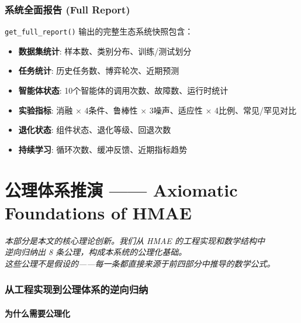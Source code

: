 \documentclass[11pt,a4paper]{ctexart}
\theoremstyle{remark}
\begin{document}
\section{系统全面报告 (Full Report)}

\texttt{get\_full\_report()} 输出的完整生态系统快照包含：
\begin{itemize}[nosep]
\item \textbf{数据集统计}: 样本数、类别分布、训练/测试划分
\item \textbf{任务统计}: 历史任务数、博弈轮次、近期预测
\item \textbf{智能体状态}: 10个智能体的调用次数、故障数、运行时统计
\item \textbf{实验指标}: 消融 $\times$ 4条件、鲁棒性 $\times$ 3噪声、适应性 $\times$ 4比例、常见/罕见对比
\item \textbf{退化状态}: 组件状态、退化等级、回退次数
\item \textbf{持续学习}: 循环次数、缓冲反馈、近期指标趋势
\end{itemize}

\part{公理体系推演 —— Axiomatic Foundations of HMAE}

\vspace{6pt}
\begin{center}
\small
\textit{本部分是本文的核心理论创新。我们从 HMAE 的工程实现和数学结构中}\\
\textit{逆向归纳出 8 条公理，构成本系统的公理化基础。}\\
\textit{这些公理不是假设的——每一条都直接来源于前四部分中推导的数学公式。}
\end{center}
\vspace{12pt}

\section{从工程实现到公理体系的逆向归纳}

\subsection{为什么需要公理化}
\end{document}
